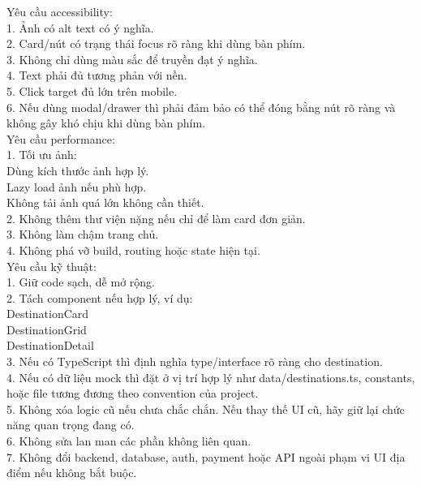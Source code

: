\begin{enumerate}
Yêu cầu accessibility: \\

1. Ảnh có alt text có ý nghĩa. \\
2. Card/nút có trạng thái focus rõ ràng khi dùng bàn phím. \\
3. Không chỉ dùng màu sắc để truyền đạt ý nghĩa. \\
4. Text phải đủ tương phản với nền. \\
5. Click target đủ lớn trên mobile. \\
6. Nếu dùng modal/drawer thì phải đảm bảo có thể đóng bằng nút rõ ràng và không gây khó chịu khi dùng bàn phím. \\

Yêu cầu performance: \\

1. Tối ưu ảnh: \\
\* Dùng kích thước ảnh hợp lý. \\
\* Lazy load ảnh nếu phù hợp. \\
\* Không tải ảnh quá lớn không cần thiết. \\

2. Không thêm thư viện nặng nếu chỉ để làm card đơn giản. \\
3. Không làm chậm trang chủ. \\
4. Không phá vỡ build, routing hoặc state hiện tại. \\

Yêu cầu kỹ thuật: \\

1. Giữ code sạch, dễ mở rộng. \\
2. Tách component nếu hợp lý, ví dụ: \\
\* DestinationCard \\
\* DestinationGrid \\
\* DestinationDetail \\

3. Nếu có TypeScript thì định nghĩa type/interface rõ ràng cho destination. \\
4. Nếu có dữ liệu mock thì đặt ở vị trí hợp lý như data/destinations.ts, constants, hoặc file tương đương theo convention của project. \\
5. Không xóa logic cũ nếu chưa chắc chắn. Nếu thay thế UI cũ, hãy giữ lại chức năng quan trọng đang có. \\
6. Không sửa lan man các phần không liên quan. \\
7. Không đổi backend, database, auth, payment hoặc API ngoài phạm vi UI địa điểm nếu không bắt buộc. \\


\end{enumerate}
